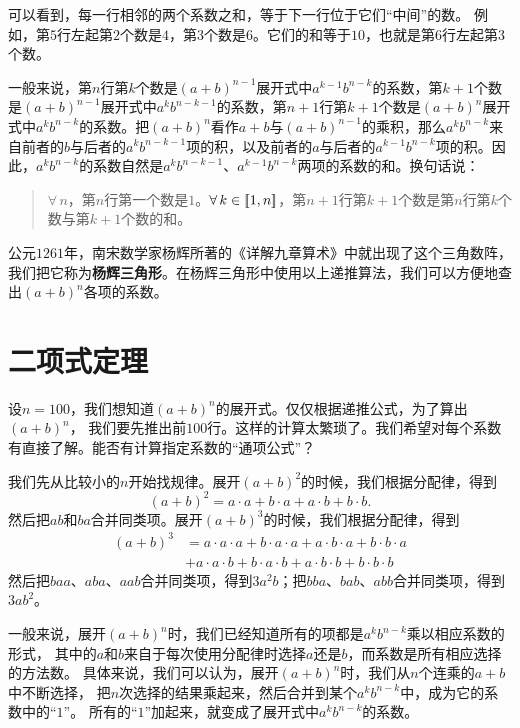 \documentclass[12pt,UTF8]{ctexbook}
\begin{document}
可以看到，每一行相邻的两个系数之和，等于下一行位于它们“中间”的数。
例如，第$5$行左起第$2$个数是$4$，第$3$个数是$6$。它们的和等于$10$，也就是第$6$行左起第$3$个数。

一般来说，第$n$行第$k$个数是$(a+b)^{n-1}$展开式中$a^{k-1}b^{n-k}$的系数，第$k+1$个数是$(a+b)^{n-1}$展开式中$a^{k}b^{n-k-1}$的系数，第$n+1$行第$k+1$个数是$(a+b)^{n}$展开式中$a^{k}b^{n-k}$的系数。把$(a+b)^n$看作$a+b$与$(a+b)^{n-1}$的乘积，那么$a^{k}b^{n-k}$来自前者的$b$与后者的$a^{k}b^{n-k-1}$项的积，以及前者的$a$与后者的$a^{k-1}b^{n-k}$项的积。因此，$a^{k}b^{n-k}$的系数自然是$a^{k}b^{n-k-1}$、$a^{k-1}b^{n-k}$两项的系数的和。换句话说：
\begin{quotation}
    $\forall \, n$，第$n$行第一个数是$1$。$\forall \, k \in [\![1,n]\!]$，第$n+1$行第$k+1$个数是第$n$行第$k$个数与第$k+1$个数的和。
\end{quotation}

公元$1261$年，南宋数学家杨辉所著的《详解九章算术》中就出现了这个三角数阵，
我们把它称为\textbf{杨辉三角形}。在杨辉三角形中使用以上递推算法，我们可以方便地查出$(a+b)^n$各项的系数。

\section{二项式定理}

设$n=100$，我们想知道$(a+b)^n$的展开式。仅仅根据递推公式，为了算出$(a+b)^n$，
我们要先推出前$100$行。这样的计算太繁琐了。我们希望对每个系数有直接了解。能否有计算指定系数的“通项公式”？

我们先从比较小的$n$开始找规律。展开$(a+b)^2$的时候，我们根据分配律，得到
$$ (a+b)^2 = a\cdot a + b\cdot a + a\cdot b + b\cdot b. $$
然后把$ab$和$ba$合并同类项。展开$(a+b)^3$的时候，我们根据分配律，得到
\begin{align*}
 (a+b)^3 &= a\cdot a\cdot a + b\cdot a\cdot a + a\cdot b\cdot a + b\cdot b\cdot a \\
  &+ a\cdot a\cdot b + b\cdot a\cdot b + a\cdot b\cdot b + b\cdot b\cdot b  
\end{align*}
然后把$baa$、$aba$、$aab$合并同类项，得到$3a^2b$；把$bba$、$bab$、$abb$合并同类项，得到$3ab^2$。

一般来说，展开$(a+b)^n$时，我们已经知道所有的项都是$a^kb^{n-k}$乘以相应系数的形式，
其中的$a$和$b$来自于每次使用分配律时选择$a$还是$b$，而系数是所有相应选择的方法数。
具体来说，我们可以认为，展开$(a+b)^n$时，我们从$n$个连乘的$a+b$中不断选择，
把$n$次选择的结果乘起来，然后合并到某个$a^kb^{n-k}$中，成为它的系数中的“$1$”。
所有的“$1$”加起来，就变成了展开式中$a^kb^{n-k}$的系数。
\end{document}
